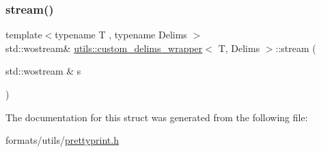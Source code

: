 \subsubsection{\texorpdfstring{stream()}{stream()}\hspace{0.1cm}{\footnotesize\ttfamily [2/2]}}
{\footnotesize\ttfamily template$<$typename T , typename Delims $>$ \\
std\+::wostream\& \mbox{\hyperlink{structutils_1_1custom__delims__wrapper}{utils\+::custom\+\_\+delims\+\_\+wrapper}}$<$ T, Delims $>$\+::stream (\begin{DoxyParamCaption}\item[{std\+::wostream \&}]{s }\end{DoxyParamCaption})\hspace{0.3cm}{\ttfamily [inline]}}



The documentation for this struct was generated from the following file\+:\begin{DoxyCompactItemize}
\item 
formats/utils/\mbox{\hyperlink{prettyprint_8h}{prettyprint.\+h}}\end{DoxyCompactItemize}
